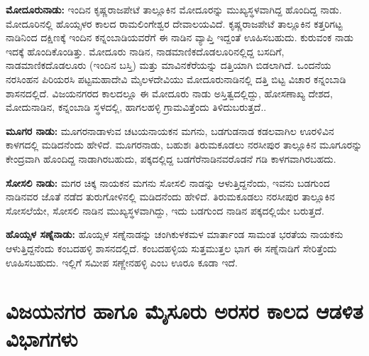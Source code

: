 \textbf{ಮೋದೂರುನಾಡು:} ಇಂದಿನ ಕೃಷ್ಣರಾಜಪೇಟೆ ತಾಲ್ಲೂಕಿನ ಮೋದೂರನ್ನು ಮುಖ್ಯಸ್ಥಳವಾಗಿದ್ದ ಹೊಂದಿದ್ದ ನಾಡು. ಮೋದೂರಿನಲ್ಲಿ ಹೊಯ್ಸಳರ ಕಾಲದ ರಾಮಲಿಂಗೇಶ್ವರ ದೇವಾಲಯವಿದೆ. ಕೃಷ್ಣರಾಜಪೇಟೆ ತಾಲ್ಲೂಕಿನ ಕತ್ತರಿಗಟ್ಟ ನಾಡಿನಿಂದ ದಕ್ಷಿಣಕ್ಕೆ ಇಂದಿನ ಕನ್ನಂಬಾಡಿಯವರೆಗೆ ಈ ನಾಡಿನ ವ್ಯಾಪ್ತಿ ಇದ್ದಂತೆ ಊಹಿಸಬಹುದು. ಕುರುವಂಕ ನಾಡು ಇದಕ್ಕೆ ಹೊಂದಿಕೊಂಡಿತ್ತು. ಮೋದೂರು ನಾಡಿನ, ನಾಡಮಾಣಿಕದೊಡಲೂರಿನಲ್ಲಿದ್ದ ಬಸದಿಗೆ, ನಾಡಮಾಣಿಕದೊಡಲೂರು (ಇಂದಿನ ಬಸ್ತಿ) ಮತ್ತು ಮಾವಿನಕೆರೆಯನ್ನು ದತ್ತಿಯಾಗಿ ಬಿಡಲಾಗಿದೆ. ಒಂದನೆಯ ನರಸಿಂಹನ ಪಿರಿಯರಸಿ ಪಟ್ಟಮಹಾದೇವಿ ಮೈಲಳದೇವಿಯು ಮೋದೂರುನಾಡಿನಲ್ಲಿ ದತ್ತಿ ಬಿಟ್ಟ ವಿಚಾರ ಕನ್ನಂಬಾಡಿ ಶಾಸನದಲ್ಲಿದೆ. ವಿಜಯನಗರದ ಕಾಲದಲ್ಲೂ ಈ ಮೋದೂರು ನಾಡು ಅಸ್ತಿತ್ವದಲ್ಲಿದ್ದು, ಹೋಸಣಾಖ್ಯ ದೇಶದ, ಮೋದುನಾಡಿನ, ಕನ್ನಂಬಾಡಿ ಸ್ಥಳದಲ್ಲಿ, ಹಾಗಲಹಳ್ಳಿ ಗ್ರಾಮವಿತ್ತೆಂದು ತಿಳಿದುಬರುತ್ತದೆ..

\textbf{ಮೂಗರ ನಾಡು:} ಮೂಗರನಾಡಾಳುವ ಚಟಯನಾಯಕನ ಮಗನು, ಬಡಗುಡನಾಡ ಕಡಲವಾಗಿಲ ಊರಳಿವಿನ ಕಾಳಗದಲ್ಲಿ ಮಡಿದನೆಂದು ಹೇಳಿದೆ. ಮೂಗರನಾಡು, ಬಹುಶಃ ತಿರುಮಕೂಡಲು ನರಸೀಪುರ ತಾಲ್ಲೂಕಿನ ಮೂಗೂರನ್ನು ಕೇಂದ್ರವಾಗಿ ಹೊಂದಿದ್ದ ನಾಡಾಗಿರಬಹುದು, ಪಕ್ಕದಲ್ಲಿದ್ದ ಬಡಗೆರೆನಾಡಿನವರೊಡನೆ ಗಡಿ ಕಾಳಗವಾಗಿರಬಹದು.

\textbf{ಸೋಸಲಿ ನಾಡು:} ಮಗರ ಚಿಕ್ಕ ನಾಯಕನ ಮಗನು ಸೋಸಲಿ ನಾಡನ್ನು ಆಳುತ್ತಿದ್ದನೆಂದು, ಇವನು ಬಡಗುಂದ ನಾಡಿನವರ ಜೊತೆ ನಡೆದ ತುರುಗೋಳಿನಲ್ಲಿ ಮಡಿದನೆಂದು ಹೇಳಿದೆ. ತಿರುಮಕೂಡಲು ನರಸೀಪುರ ತಾಲ್ಲೂಕಿನ ಸೋಸಲೆಯೇ, ಸೋಸಲಿ ನಾಡಿನ ಮುಖ್ಯಸ್ಥಳವಾಗಿದ್ದು, ಇದು ಬಡಗುಂದ ನಾಡಿನ ಪಕ್ಕದಲ್ಲಿಯೇ ಬರುತ್ತದೆ.

\textbf{ಹೊಯ್ಸಳ ಸಣ್ನೆನಾಡು:} ಹೊಯ್ಸಳ ಸಣ್ನೆನಾಡನ್ನು ಚಂಗಿಕುಳಕಮಳ ಮಾರ್ತಾಂಡ ಸಾಮಂತ ಭರತೆಯ ನಾಯಕನು ಆಳುತ್ತಿದ್ದನೆಂದು ಕಂಬದಹಳ್ಳಿ ಶಾಸನದಲ್ಲಿದೆ. ಕಂಬದಹಳ್ಳಿಯ ಸುತ್ತಮುತ್ತಲ ಭಾಗ ಈ ಸಣ್ನೆನಾಡಿಗೆ ಸೇರಿತ್ತೆಂದು ಊಹಿಸಬಹುದು. ಇಲ್ಲಿಗೆ ಸಮೀಪ ಸಣ್ಣೇನಹಳ್ಳಿ ಎಂಬ ಊರೂ ಕೂಡಾ ಇದೆ.


\section{ವಿಜಯನಗರ ಹಾಗೂ ಮೈಸೂರು ಅರಸರ ಕಾಲದ ಆಡಳಿತ ವಿಭಾಗಗಳು}

\vskip -4pt

